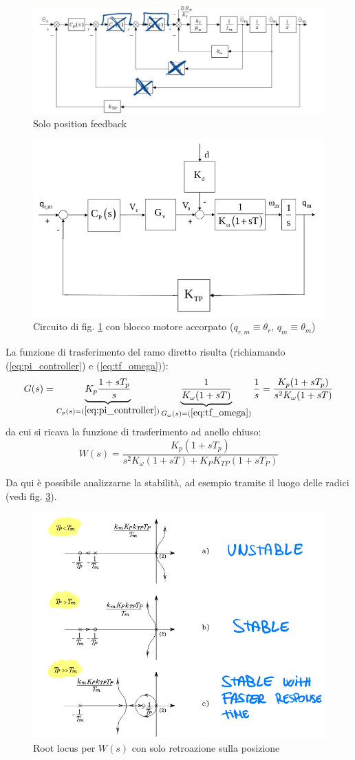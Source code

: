 \begin{figure}[ht!]
	\centering
	\includegraphics[width=0.7\linewidth]{images/position_feedback}
	\caption{Solo position feedback}
	\label{fig:positionfeedback}
\end{figure}

\begin{figure}
	\centering
	\includegraphics[width=0.7\linewidth]{images/position_feedback_control}
	\caption{Circuito di fig. \ref{fig:positionfeedback} con blocco motore accorpato ($q_{r,m}\equiv\theta_r$, $q_m \equiv \theta_m$)}
	\label{fig:positionfeedbackcontrol}
\end{figure}



La funzione di trasferimento del ramo diretto risulta (richiamando (\ref{eq:pi_controller}) e (\ref{eq:tf_omega})):
$$
G(s) = 
\underbrace{K_p \frac{1+sT_p}{s}}_{C_p(s)=(\ref{eq:pi_controller})}
\underbrace{ \frac{1}{K_\omega(1 + sT)} }_{G_\omega(s) =(\ref{eq:tf_omega})}
\frac{1}{s}
= \frac{K_p(1+sT_p)}{s^2K_\omega(1+sT)}
$$
da cui si ricava la funzione di trasferimento ad anello chiuso:
$$
W(s) = \frac{K_p(1+sT_p)}{s^2K_\omega(1+sT) + K_P K_{TP} (1+sT_P)}
$$

Da qui è possibile analizzarne la stabilità, ad esempio tramite il luogo delle radici (vedi fig. \ref{fig:rootlocus1}).

\begin{figure}[ht!]
	\centering
	\includegraphics[width=0.7\linewidth]{images/root_locus_1}
	\caption{Root locus per $W(s)$ con solo retroazione sulla posizione}
	\label{fig:rootlocus1}
\end{figure}


